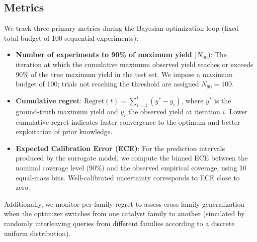 \documentclass{article}
\begin{document}
\subsection{Metrics}
We track three primary metrics during the Bayesian optimization loop (fixed total budget of 100 sequential experiments):
\begin{itemize}
    \item \textbf{Number of experiments to 90\% of maximum yield} ($N_{90}$): The iteration at which the cumulative maximum observed yield reaches or exceeds 90\% of the true maximum yield in the test set. We impose a maximum budget of 100; trials not reaching the threshold are assigned $N_{90}=100$.
    \item \textbf{Cumulative regret}: $\text{Regret}(t) = \sum_{i=1}^{t} (y^* - y_i)$, where $y^*$ is the ground-truth maximum yield and $y_i$ the observed yield at iteration $i$. Lower cumulative regret indicates faster convergence to the optimum and better exploitation of prior knowledge.
    \item \textbf{Expected Calibration Error (ECE)}: For the prediction intervals produced by the surrogate model, we compute the binned ECE between the nominal coverage level (90\%) and the observed empirical coverage, using 10 equal-mass bins. Well-calibrated uncertainty corresponds to ECE close to zero.
\end{itemize}
Additionally, we monitor per-family regret to assess cross-family generalization when the optimizer switches from one catalyst family to another (simulated by randomly interleaving queries from different families according to a discrete uniform distribution).
\end{document}
